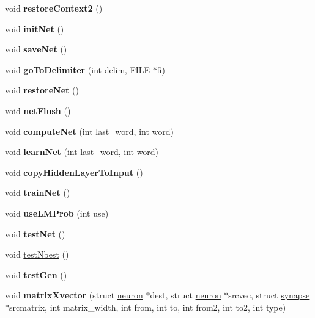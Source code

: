 \begin{DoxyCompactItemize}
void {\bfseries restore\+Context2} ()
\item 
\mbox{\label{class_c_rnn_l_m_a0eff58ac237b3d83e0fee02cb769e440}} 
void {\bfseries init\+Net} ()
\item 
\mbox{\label{class_c_rnn_l_m_a64df901ea83fd5f554e3d18afba1f3fb}} 
void {\bfseries save\+Net} ()
\item 
\mbox{\label{class_c_rnn_l_m_ad2a895c2a52eaaa073b6939283ec94e5}} 
void {\bfseries go\+To\+Delimiter} (int delim, F\+I\+LE $\ast$fi)
\item 
\mbox{\label{class_c_rnn_l_m_a929fc03c03c2c216674c10b76c79e61c}} 
void {\bfseries restore\+Net} ()
\item 
\mbox{\label{class_c_rnn_l_m_affa9fdc1830f1269bbfd329584d856fd}} 
void {\bfseries net\+Flush} ()
\item 
\mbox{\label{class_c_rnn_l_m_a03796dc7440f3476376f94428e3c000a}} 
void {\bfseries compute\+Net} (int last\+\_\+word, int word)
\item 
\mbox{\label{class_c_rnn_l_m_af8363f58e0c76b9a4e53ffdc5067056a}} 
void {\bfseries learn\+Net} (int last\+\_\+word, int word)
\item 
\mbox{\label{class_c_rnn_l_m_a8fecbd550ae3171d0126bf08c9c2c75a}} 
void {\bfseries copy\+Hidden\+Layer\+To\+Input} ()
\item 
\mbox{\label{class_c_rnn_l_m_ac8e7558dab19f4992c6e82d29f9586a2}} 
void {\bfseries train\+Net} ()
\item 
\mbox{\label{class_c_rnn_l_m_a29b901d49ba5407f42399ba8480abf79}} 
void {\bfseries use\+L\+M\+Prob} (int use)
\item 
\mbox{\label{class_c_rnn_l_m_adb19b3e4ef51c86b7b20157da4e80166}} 
void {\bfseries test\+Net} ()
\item 
void \hyperlink{class_c_rnn_l_m_aa2625f24a2ac406eba4e38a57755097e}{test\+Nbest} ()
\item 
\mbox{\label{class_c_rnn_l_m_a26a06bc47ff999e1d6f96a2e766a2dc5}} 
void {\bfseries test\+Gen} ()
\item 
\mbox{\label{class_c_rnn_l_m_aa9008bc53dc8c4e45c6a884bf2b40882}} 
void {\bfseries matrix\+Xvector} (struct \hyperlink{structneuron}{neuron} $\ast$dest, struct \hyperlink{structneuron}{neuron} $\ast$srcvec, struct \hyperlink{structsynapse}{synapse} $\ast$srcmatrix, int matrix\+\_\+width, int from, int to, int from2, int to2, int type)
\end{DoxyCompactItemize}
